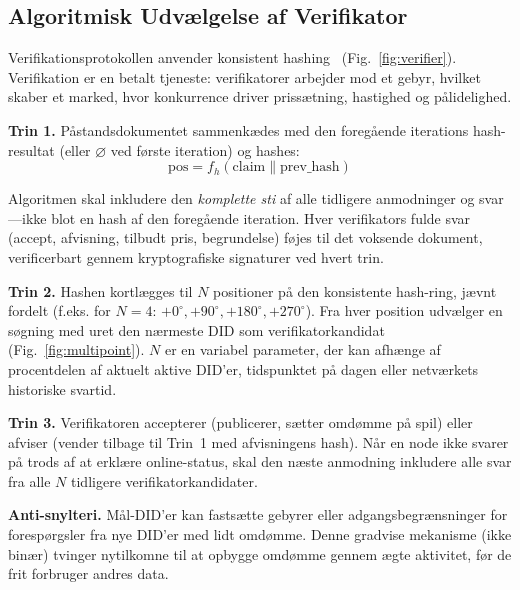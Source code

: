 \documentclass[11pt,a4paper,twocolumn]{article}
\begin{document}
\subsection{Algoritmisk Udvælgelse af Verifikator}

Verifikationsprotokollen anvender konsistent hashing~\cite{karger1997} (Fig.~\ref{fig:verifier}). Verifikation er en betalt tjeneste: verifikatorer arbejder mod et gebyr, hvilket skaber et marked, hvor konkurrence driver prissætning, hastighed og pålidelighed.

\textbf{Trin 1.} Påstandsdokumentet sammenkædes med den foregående iterations hash-resultat (eller $\varnothing$ ved første iteration) og hashes:
\begin{equation}
\text{pos} = f_h(\text{claim} \| \text{prev\_hash})
\label{eq:hash}
\end{equation}

Algoritmen skal inkludere den \emph{komplette sti} af alle tidligere anmodninger og svar---ikke blot en hash af den foregående iteration. Hver verifikators fulde svar (accept, afvisning, tilbudt pris, begrundelse) føjes til det voksende dokument, verificerbart gennem kryptografiske signaturer ved hvert trin.

\textbf{Trin 2.} Hashen kortlægges til $N$ positioner på den konsistente hash-ring, jævnt fordelt (f.eks. for $N=4$: $+0^{\circ}, +90^{\circ}, +180^{\circ}, +270^{\circ}$). Fra hver position udvælger en søgning med uret den nærmeste DID som verifikatorkandidat (Fig.~\ref{fig:multipoint}). $N$ er en variabel parameter, der kan afhænge af procentdelen af aktuelt aktive DID'er, tidspunktet på dagen eller netværkets historiske svartid.

\textbf{Trin 3.} Verifikatoren accepterer (publicerer, sætter omdømme på spil) eller afviser (vender tilbage til Trin~1 med afvisningens hash). Når en node ikke svarer på trods af at erklære online-status, skal den næste anmodning inkludere alle svar fra alle $N$ tidligere verifikatorkandidater.

\textbf{Anti-snylteri.} Mål-DID'er kan fastsætte gebyrer eller adgangsbegrænsninger for forespørgsler fra nye DID'er med lidt omdømme. Denne gradvise mekanisme (ikke binær) tvinger nytilkomne til at opbygge omdømme gennem ægte aktivitet, før de frit forbruger andres data.
\end{document}
